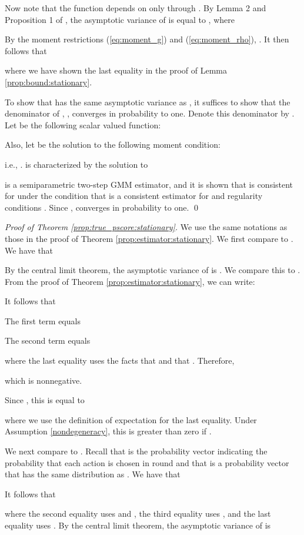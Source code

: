 \documentclass[letterpaper]{article} \usepackage{aaai19}  \usepackage{times}  \usepackage{helvet}  \usepackage{courier}  \usepackage{url}  \usepackage{graphicx}  \frenchspacing  \usepackage{comment}
\newcommand{\citet}[1]
{\citeauthor{#1} \shortcite{#1}}
\begin{document}
Now note that the function  depends on  only through .
By Lemma 2 and Proposition 1 of \citet{Ackerberg2014}, the asymptotic variance of  is equal to , where

By the moment restrictions (\ref{eq:moment_g}) and (\ref{eq:moment_rho}), .
It then follows that

where we have shown the last equality in the proof of Lemma \ref{prop:bound:stationary}.

To show that  has the same asymptotic variance as , it suffices to show that the denominator of , , converges in probability to one.
Denote this denominator by .
Let  be the following scalar valued function:

Also, let  be the solution to the following moment condition:

i.e., .
 is characterized by the solution to

 is a semiparametric two-step GMM estimator, and it is shown that  is consistent for  under the condition that  is a consistent estimator for  and regularity conditions \cite{Newey1994}.
Since ,  converges in probability to one.
\qed
\par
\noindent
\noindent \textit{Proof of Theorem \ref{prop:true_pscore:stationary}.}
We use the same notations as those in the proof of Theorem \ref{prop:estimator:stationary}.
We first compare  to .
We have that

By the central limit theorem, the asymptotic variance of  is .
We compare this to .
From the proof of Theorem \ref{prop:estimator:stationary}, we can write:

It follows that

The first term equals

The second term equals

where the last equality uses the facts that  and that .
Therefore,

which is nonnegative.

Since , this is equal to

where we use the definition of expectation for the last equality.
Under Assumption \ref{nondegeneracy}, this is greater than zero if .

We next compare  to .
Recall that  is the probability vector indicating the probability that each action is chosen in round  and that  is a probability vector that has the same distribution as .
We have that

It follows that

where the second equality uses  and , the third equality uses , and the last equality uses .
By the central limit theorem, the asymptotic variance of  is
\end{document}
